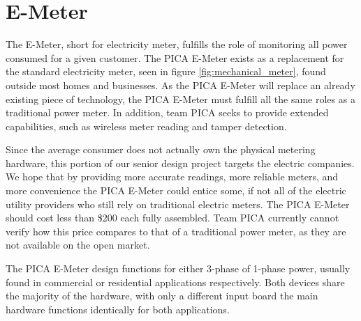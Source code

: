 \section{E-Meter}
The E-Meter, short for electricity meter, fulfills the role of monitoring all power consumed for a given customer. The PICA E-Meter exists as a replacement for the standard electricity meter, seen in figure \ref{fig:mechanical_meter}, found outside most homes and businesses. As the PICA E-Meter will replace an already existing piece of technology, the PICA E-Meter must fulfill all the same roles as a traditional power meter. In addition, team PICA seeks to provide extended capabilities, such as wireless meter reading and tamper detection.

Since the average consumer does not actually own the physical metering hardware, this portion of our senior design project targets the electric companies. We hope that by providing more accurate readings, more reliable meters, and more convenience the PICA E-Meter could entice some, if not all of the electric utility providers who still rely on traditional electric meters. The PICA E-Meter should cost less than \$200 each fully assembled. Team PICA currently cannot verify how this price compares to that of a traditional power meter, as they are not available on the open market.

The PICA E-Meter design functions for either 3-phase of 1-phase power, usually found in commercial or residential applications respectively. Both devices share the majority of the hardware, with only a different input board the main hardware functions identically for both applications.

